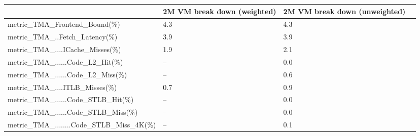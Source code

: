 \documentclass[12pt]{article}
\begin{document}
\begin{longtable}{|b{204.20pt}|b{89.20pt}|b{89.20pt}|@{}b{0pt}@{}}
\hline
\centering\arraybackslash{} & \centering\arraybackslash{}2M VM break down (weighted) & \centering\arraybackslash{}2M VM break down (unweighted) & \rule[-0.00pt]{0pt}{11.65pt} \\ \hline \endfirsthead
\cellcolor[HTML]{F8CBAD}\raggedright\arraybackslash{}metric\_\allowbreak{}TMA\_\allowbreak{}Frontend\_\allowbreak{}Bound(\%) & \cellcolor[HTML]{F8CBAD}\centering\arraybackslash{}4.3 & \cellcolor[HTML]{F8CBAD}\centering\arraybackslash{}4.3 & \rule[-0.00pt]{0pt}{11.65pt} \\ \hline
\raggedright\arraybackslash{}metric\_\allowbreak{}TMA\_\allowbreak{}..Fetch\_\allowbreak{}Latency(\%) & \centering\arraybackslash{}3.9 & \centering\arraybackslash{}3.9 & \rule[-0.00pt]{0pt}{11.65pt} \\ \hline
\cellcolor[HTML]{F8CBAD}\raggedright\arraybackslash{}metric\_\allowbreak{}TMA\_\allowbreak{}....ICache\_\allowbreak{}Misses(\%) & \cellcolor[HTML]{F8CBAD}\centering\arraybackslash{}1.9 & \cellcolor[HTML]{F8CBAD}\centering\arraybackslash{}2.1 & \rule[-0.00pt]{0pt}{11.65pt} \\ \hline
\raggedright\arraybackslash{}metric\_\allowbreak{}TMA\_\allowbreak{}......Code\_\allowbreak{}L2\_\allowbreak{}Hit(\%) & \centering\arraybackslash{}– & \centering\arraybackslash{}0.0 & \rule[-0.00pt]{0pt}{11.65pt} \\ \hline
\raggedright\arraybackslash{}metric\_\allowbreak{}TMA\_\allowbreak{}......Code\_\allowbreak{}L2\_\allowbreak{}Miss(\%) & \centering\arraybackslash{}– & \centering\arraybackslash{}0.6 & \rule[-0.00pt]{0pt}{11.65pt} \\ \hline
\raggedright\arraybackslash{}metric\_\allowbreak{}TMA\_\allowbreak{}....ITLB\_\allowbreak{}Misses(\%) & \centering\arraybackslash{}0.7 & \centering\arraybackslash{}0.9 & \rule[-0.00pt]{0pt}{11.65pt} \\ \hline
\raggedright\arraybackslash{}metric\_\allowbreak{}TMA\_\allowbreak{}......Code\_\allowbreak{}STLB\_\allowbreak{}Hit(\%) & \centering\arraybackslash{}– & \centering\arraybackslash{}0.0 & \rule[-0.00pt]{0pt}{11.65pt} \\ \hline
\raggedright\arraybackslash{}metric\_\allowbreak{}TMA\_\allowbreak{}......Code\_\allowbreak{}STLB\_\allowbreak{}Miss(\%) & \centering\arraybackslash{}– & \centering\arraybackslash{}0.0 & \rule[-0.00pt]{0pt}{11.65pt} \\ \hline
\raggedright\arraybackslash{}metric\_\allowbreak{}TMA\_\allowbreak{}........Code\_\allowbreak{}STLB\_\allowbreak{}Miss\_\allowbreak{}4K(\%) & \centering\arraybackslash{}– & \centering\arraybackslash{}0.1 & \rule[-0.00pt]{0pt}{11.65pt} \\ \hline

\end{longtable}
\end{document}
